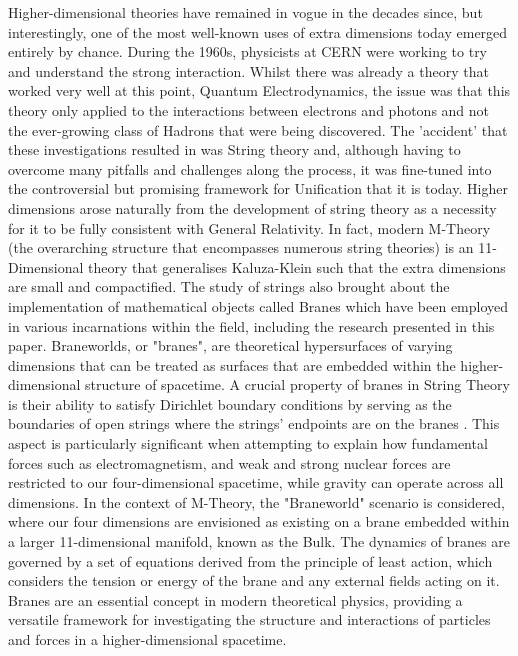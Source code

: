 \documentclass[11pt]{report}
\numberwithin{equation}{chapter}
\begin{document}
Higher-dimensional theories have remained in vogue in the decades since, but interestingly, one of the most well-known uses of extra dimensions today emerged entirely by chance. During the 1960s, physicists at CERN were working to try and understand the strong interaction\cite{stringreview}. Whilst there was already a theory that worked very well at this point, Quantum Electrodynamics, the issue was that this theory only applied to the interactions between electrons and photons and not the ever-growing class of Hadrons that were being discovered. The 'accident' that these investigations resulted in was String theory and, although having to overcome many pitfalls and challenges along the process, it was fine-tuned into the controversial but promising framework for Unification that it is today. Higher dimensions arose naturally from the development of string theory as a necessity for it to be fully consistent with General Relativity. In fact, modern M-Theory (the overarching structure that encompasses numerous string theories) is an 11-Dimensional theory\cite{Mtheory} that generalises Kaluza-Klein such that the extra dimensions are small and compactified. The study of strings also brought about the implementation of mathematical objects called Branes which have been employed in various incarnations within the field, including the research presented in this paper. Braneworlds, or "branes", are theoretical hypersurfaces of varying dimensions that can be treated as surfaces that are embedded within the higher-dimensional structure of spacetime. A crucial property of branes in String Theory is their ability to satisfy Dirichlet boundary conditions by serving as the boundaries of open strings where the strings' endpoints are on the branes \cite{Polchinski_1995}. This aspect is particularly significant when attempting to explain how fundamental forces such as electromagnetism, and weak and strong nuclear forces are restricted to our four-dimensional spacetime, while gravity can operate across all dimensions. In the context of M-Theory\cite{Mtheory}, the "Braneworld" scenario is considered, where our four dimensions are envisioned as existing on a brane embedded within a larger 11-dimensional manifold, known as the Bulk. The dynamics of branes are governed by a set of equations derived from the principle of least action, which considers the tension or energy of the brane and any external fields acting on it. Branes are an essential concept in modern theoretical physics, providing a versatile framework for investigating the structure and interactions of particles and forces in a higher-dimensional spacetime.
\end{document}
